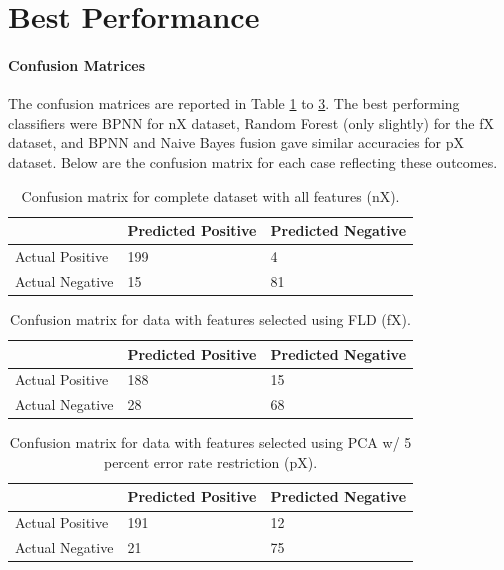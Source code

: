 \documentclass{article}
\begin{document}
\section{Best Performance}

\paragraph{Confusion Matrices}
The confusion matrices are reported in Table \ref{tab:cfnx} to \ref{tab:cfpca}. The best performing classifiers were BPNN for nX dataset, Random Forest (only slightly) for the fX dataset, and BPNN and Naive Bayes fusion gave similar accuracies for pX dataset. Below are the confusion matrix for each case reflecting these outcomes.

\begin{table}[h]
\centering
\begin{tabular}{l|ll}
                & Predicted Positive & Predicted Negative \\ \hline
Actual Positive & 199                & 4                 \\
Actual Negative & 15                 & 81                
\end{tabular}
\caption{Confusion matrix for complete dataset with all features (nX).}
\label{tab:cfnx}
\end{table}

\begin{table}[h]
\centering
\begin{tabular}{l|ll}
                & Predicted Positive & Predicted Negative \\ \hline
Actual Positive & 188                & 15                 \\
Actual Negative & 28                 & 68                
\end{tabular}
\caption{Confusion matrix for data with features selected using FLD (fX).}
\label{tab:cffld}
\end{table}

\begin{table}[h]
\centering
\begin{tabular}{l|ll}
                & Predicted Positive & Predicted Negative \\ \hline
Actual Positive & 191                & 12                  \\
Actual Negative & 21                 & 75                
\end{tabular}
\caption{Confusion matrix for data with features selected using PCA w/ 5 percent error rate restriction (pX).}
\label{tab:cfpca}
\end{table}
\end{document}
